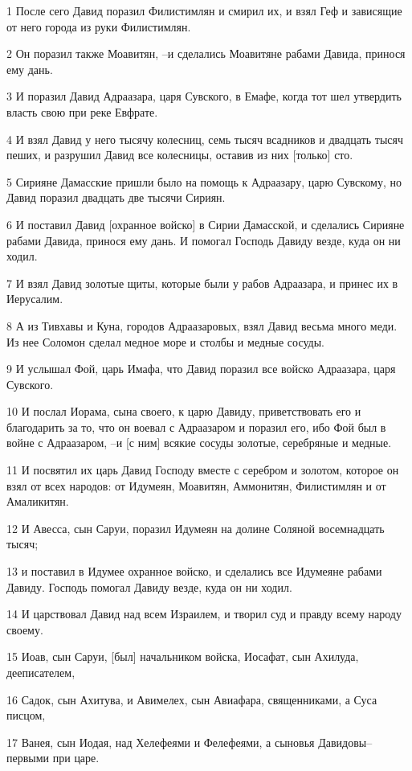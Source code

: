 \par 1 После сего Давид поразил Филистимлян и смирил их, и взял Геф и зависящие от него города из руки Филистимлян.
\par 2 Он поразил также Моавитян, --и сделались Моавитяне рабами Давида, принося ему дань.
\par 3 И поразил Давид Адраазара, царя Сувского, в Емафе, когда тот шел утвердить власть свою при реке Евфрате.
\par 4 И взял Давид у него тысячу колесниц, семь тысяч всадников и двадцать тысяч пеших, и разрушил Давид все колесницы, оставив из них [только] сто.
\par 5 Сирияне Дамасские пришли было на помощь к Адраазару, царю Сувскому, но Давид поразил двадцать две тысячи Сириян.
\par 6 И поставил Давид [охранное войско] в Сирии Дамасской, и сделались Сирияне рабами Давида, принося ему дань. И помогал Господь Давиду везде, куда он ни ходил.
\par 7 И взял Давид золотые щиты, которые были у рабов Адраазара, и принес их в Иерусалим.
\par 8 А из Тивхавы и Куна, городов Адраазаровых, взял Давид весьма много меди. Из нее Соломон сделал медное море и столбы и медные сосуды.
\par 9 И услышал Фой, царь Имафа, что Давид поразил все войско Адраазара, царя Сувского.
\par 10 И послал Иорама, сына своего, к царю Давиду, приветствовать его и благодарить за то, что он воевал с Адраазаром и поразил его, ибо Фой был в войне с Адраазаром, --и [с ним] всякие сосуды золотые, серебряные и медные.
\par 11 И посвятил их царь Давид Господу вместе с серебром и золотом, которое он взял от всех народов: от Идумеян, Моавитян, Аммонитян, Филистимлян и от Амаликитян.
\par 12 И Авесса, сын Саруи, поразил Идумеян на долине Соляной восемнадцать тысяч;
\par 13 и поставил в Идумее охранное войско, и сделались все Идумеяне рабами Давиду. Господь помогал Давиду везде, куда он ни ходил.
\par 14 И царствовал Давид над всем Израилем, и творил суд и правду всему народу своему.
\par 15 Иоав, сын Саруи, [был] начальником войска, Иосафат, сын Ахилуда, дееписателем,
\par 16 Садок, сын Ахитува, и Авимелех, сын Авиафара, священниками, а Суса писцом,
\par 17 Ванея, сын Иодая, над Хелефеями и Фелефеями, а сыновья Давидовы--первыми при царе.

